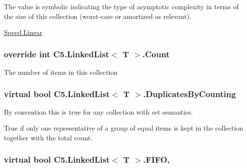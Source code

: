 The value is symbolic indicating the type of asymptotic complexity in terms of the size of this collection (worst-\/case or amortized as relevant). 

\hyperlink{namespace_c5_a615ba88dcdaa8d5a3c5f833a73d7fad6a32a843da6ea40ab3b17a3421ccdf671b}{Speed.\+Linear}\hypertarget{class_c5_1_1_linked_list_a52f3c3922d1c223482cf8071d7e1437d}{}
\subsubsection[{Count}]{\setlength{\rightskip}{0pt plus 5cm}override int {\bf C5.\+Linked\+List}$<$ T $>$.Count\hspace{0.3cm}{\ttfamily [get]}}\label{class_c5_1_1_linked_list_a52f3c3922d1c223482cf8071d7e1437d}




The number of items in this collection\hypertarget{class_c5_1_1_linked_list_ad319faafaee30104fe18d6ab1484e126}{}
\subsubsection[{Duplicates\+By\+Counting}]{\setlength{\rightskip}{0pt plus 5cm}virtual bool {\bf C5.\+Linked\+List}$<$ T $>$.Duplicates\+By\+Counting\hspace{0.3cm}{\ttfamily [get]}}\label{class_c5_1_1_linked_list_ad319faafaee30104fe18d6ab1484e126}


By convention this is true for any collection with set semantics. 

True if only one representative of a group of equal items is kept in the collection together with the total count.\hypertarget{class_c5_1_1_linked_list_ac6d581d8bb85903ee40b32b056dd25a2}{}
\subsubsection[{F\+I\+F\+O}]{\setlength{\rightskip}{0pt plus 5cm}virtual bool {\bf C5.\+Linked\+List}$<$ T $>$.F\+I\+F\+O\hspace{0.3cm}{\ttfamily [get]}, {\ttfamily [set]}}\label{class_c5_1_1_linked_list_ac6d581d8bb85903ee40b32b056dd25a2}


